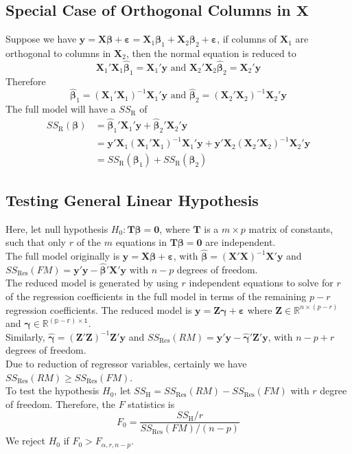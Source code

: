 \documentclass[11pt]{article}
\theoremstyle{definition}
\begin{document}
\subsection{Special Case of Orthogonal Columns in {$\bm{X}$}}
Suppose we have $\bm{y}=\bm{X\beta}+\bm{\varepsilon}=\bm{X}_1\bm{\beta}_1+\bm{X}_2\bm{\beta}_2+\bm{\varepsilon}$, if columns of $\bm{X}_1$ are orthogonal to columns in $\bm{X}_2$, then the normal equation is reduced to
\[
\bm{X}_1'\bm{X}_1\bm{\hat{\beta}}_1=\bm{X}_1'\bm{y}\text{  and  }\bm{X}_2'\bm{X}_2\bm{\hat{\beta}}_2=\bm{X}_2'\bm{y}
\]
Therefore
\[
\bm{\hat{\beta}}_1=(\bm{X}_1'\bm{X}_1)^{-1}\bm{X}_1'\bm{y}\text{  and  }\bm{\hat{\beta}}_2=(\bm{X}_2'\bm{X}_2)^{-1}\bm{X}_2'\bm{y}
\]
The full model will have a $SS_\text{R}$ of
\begin{align*}
SS_\text{R}(\bm{\beta})&=\bm{\hat{\beta}}_1'\bm{X}_1'\bm{y}+\bm{\hat{\beta}}_2'\bm{X}_2'\bm{y}\\
&=\bm{y}'\bm{X}_1(\bm{X}_1'\bm{X}_1)^{-1}\bm{X}_1'\bm{y}+\bm{y}'\bm{X}_2(\bm{X}_2'\bm{X}_2)^{-1}\bm{X}_2'\bm{y}\\
&=SS_\text{R}(\bm{\beta}_1)+SS_\text{R}(\bm{\beta}_2)
\end{align*}
\subsection{Testing General Linear Hypothesis}
Here, let null hypothesis $H_0:\bm{T\beta}=\bm{0}$, where $\bm{T}$ is a $m\times p$ matrix of constants, such that only $r$ of the $m$ equations in $\bm{T\beta}=\bm{0}$ are independent.\\
The full model originally is $\bm{y}=\bm{X\beta}+\bm{\varepsilon}$, with $\bm{\hat{\beta}}=(\bm{X}'\bm{X})^{-1}\bm{X}'\bm{y}$ and $SS_\text{Res}(FM)=\bm{y}'\bm{y}-\bm{\hat{\beta}}'\bm{X}'\bm{y}$ with $n-p$ degrees of freedom.\\
The reduced model is generated by using $r$ independent equations to solve for $r$ of the regression coefficients in the full model in terms of the remaining $p-r$ regression coefficients. The reduced model is $\bm{y}=\bm{Z\gamma}+\bm{\varepsilon}$ where $\bm{Z}\in\mathbb{R}^{n\times(p-r)}$ and $\bm{\gamma}\in\mathbb{R^{(p-r)\times 1}}$.\\
Similarly, $\hat{\bm{\gamma}}=(\bm{Z}'\bm{Z})^{-1}\bm{Z}'\bm{y}$ and $SS_\text{Res}(RM)=\bm{y}'\bm{y}-\bm{\hat{\gamma}}'\bm{Z}'\bm{y}$, with $n-p+r$ degrees of freedom.\\
Due to reduction of regressor variables, certainly we have $SS_\text{Res}(RM)\geq SS_\text{Res}(FM)$.\\
To test the hypothesis $H_0$, let $SS_\text{H}=SS_\text{Res}(RM)- SS_\text{Res}(FM)$ with $r$ degree of freedom. Therefore, the $F$ statistics is
\[
F_0=\frac{SS_\text{H}/r}{SS_\text{Res}(FM)/(n-p)}
\]
We reject $H_0$ if $F_0>F_{\alpha, r, n-p}$.
\end{document}
